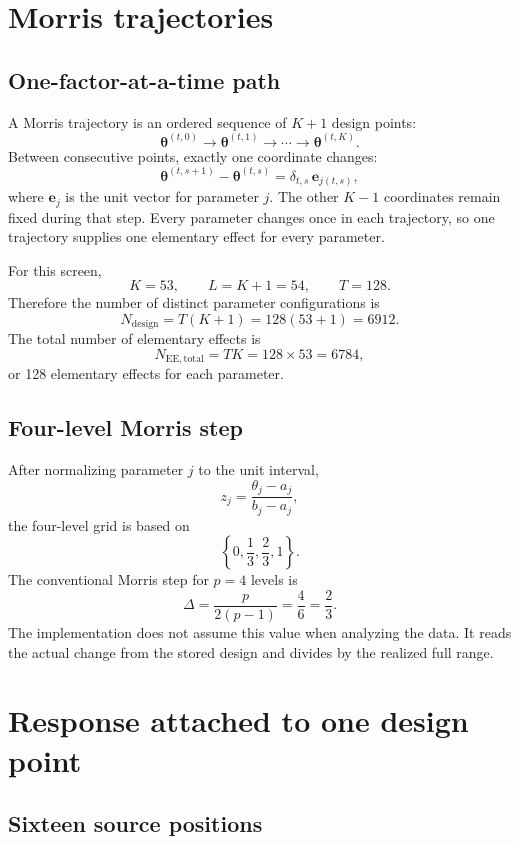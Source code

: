 \documentclass[11pt]{article}
\begin{document}
\section{Morris trajectories}

\subsection{One-factor-at-a-time path}

A Morris trajectory is an ordered sequence of $K+1$ design points:
\[
\boldsymbol{\theta}^{(t,0)}
\longrightarrow
\boldsymbol{\theta}^{(t,1)}
\longrightarrow\cdots\longrightarrow
\boldsymbol{\theta}^{(t,K)}.
\]
Between consecutive points, exactly one coordinate changes:
\[
\boldsymbol{\theta}^{(t,s+1)}
-
\boldsymbol{\theta}^{(t,s)}
=
\delta_{t,s}\,\mathbf{e}_{j(t,s)},
\]
where $\mathbf{e}_{j}$ is the unit vector for parameter $j$.  The other
$K-1$ coordinates remain fixed during that step.  Every parameter changes
once in each trajectory, so one trajectory supplies one elementary effect
for every parameter.

For this screen,
\[
K=53,\qquad L=K+1=54,\qquad T=128.
\]
Therefore the number of distinct parameter configurations is
\[
N_{\mathrm{design}}
=T(K+1)
=128(53+1)
=6912.
\]
The total number of elementary effects is
\[
N_{\mathrm{EE,total}}=TK=128\times53=6784,
\]
or 128 elementary effects for each parameter.

\subsection{Four-level Morris step}

After normalizing parameter $j$ to the unit interval,
\[
z_j=\frac{\theta_j-a_j}{b_j-a_j},
\]
the four-level grid is based on
\[
\left\{0,\frac13,\frac23,1\right\}.
\]
The conventional Morris step for $p=4$ levels is
\[
\Delta=\frac{p}{2(p-1)}=\frac{4}{6}=\frac23.
\]
The implementation does not assume this value when analyzing the data.  It
reads the actual change from the stored design and divides by the realized
full range.

\section{Response attached to one design point}

\subsection{Sixteen source positions}
\end{document}
